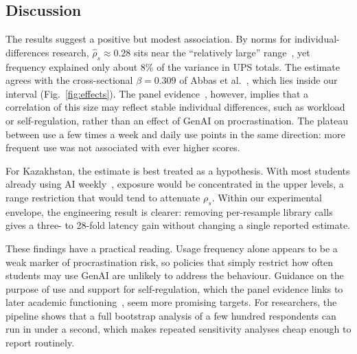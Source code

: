 \subsection{Discussion}\label{sec:discussion}
The results suggest a positive but modest association. By norms for individual-differences research, $\hat\rho_s\approx0.28$ sits near the ``relatively large'' range~\cite{gignac2016effect}, yet frequency explained only about 8\% of the variance in UPS totals. The estimate agrees with the cross-sectional $\beta=0.309$ of Abbas et al.~\cite{abbas2024harmful}, which lies inside our interval (Fig.~\ref{fig:effects}). The panel evidence~\cite{zhao2026panel}, however, implies that a correlation of this size may reflect stable individual differences, such as workload or self-regulation, rather than an effect of GenAI on procrastination. The plateau between use a few times a week and daily use points in the same direction: more frequent use was not associated with ever higher scores.

For Kazakhstan, the estimate is best treated as a hypothesis. With most students already using AI weekly~\cite{askarkyzy2024perceptions}, exposure would be concentrated in the upper levels, a range restriction that would tend to attenuate $\rho_s$. Within our experimental envelope, the engineering result is clearer: removing per-resample library calls gives a three- to 28-fold latency gain without changing a single reported estimate.

These findings have a practical reading. Usage frequency alone appears to be a weak marker of procrastination risk, so policies that simply restrict how often students may use GenAI are unlikely to address the behaviour. Guidance on the purpose of use and support for self-regulation, which the panel evidence links to later academic functioning~\cite{zhao2026panel}, seem more promising targets. For researchers, the pipeline shows that a full bootstrap analysis of a few hundred respondents can run in under a second, which makes repeated sensitivity analyses cheap enough to report routinely.
